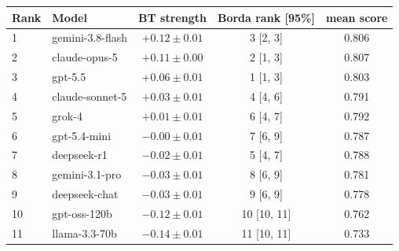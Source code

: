 \begin{tabular}{llccc}
\toprule
Rank & Model & BT strength & Borda rank [95\%] & mean score \\
\midrule
1 & gemini-3.8-flash & $+0.12 \pm 0.01$ & 3 [2, 3] & 0.806 \\
2 & claude-opus-5 & $+0.11 \pm 0.00$ & 2 [1, 3] & 0.807 \\
3 & gpt-5.5 & $+0.06 \pm 0.01$ & 1 [1, 3] & 0.803 \\
4 & claude-sonnet-5 & $+0.03 \pm 0.01$ & 4 [4, 6] & 0.791 \\
5 & grok-4 & $+0.01 \pm 0.01$ & 6 [4, 7] & 0.792 \\
6 & gpt-5.4-mini & $-0.00 \pm 0.01$ & 7 [6, 9] & 0.787 \\
7 & deepseek-r1 & $-0.02 \pm 0.01$ & 5 [4, 7] & 0.788 \\
8 & gemini-3.1-pro & $-0.03 \pm 0.01$ & 8 [6, 9] & 0.781 \\
9 & deepseek-chat & $-0.03 \pm 0.01$ & 9 [6, 9] & 0.778 \\
10 & gpt-oss-120b & $-0.12 \pm 0.01$ & 10 [10, 11] & 0.762 \\
11 & llama-3.3-70b & $-0.14 \pm 0.01$ & 11 [10, 11] & 0.733 \\
\bottomrule
\end{tabular}
